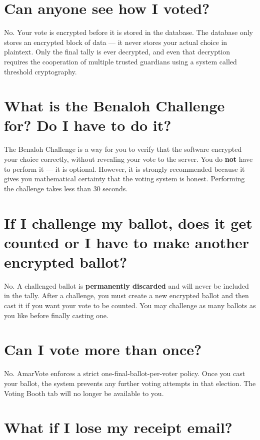 \documentclass[12pt,a4paper,openany]{book}
\begin{document}
\section*{Can anyone see how I voted?}

No. Your vote is encrypted before it is stored in the database. The database only stores an encrypted block of data --- it never stores your actual choice in plaintext.  Only the final tally is ever decrypted, and even that decryption requires the cooperation of multiple trusted guardians using a system called threshold cryptography.

\section*{What is the Benaloh Challenge for? Do I have to do it?}

The Benaloh Challenge is a way for you to verify that the software encrypted your choice correctly, without revealing your vote to the server. You do \textbf{not} have to perform it --- it is optional. However, it is strongly recommended because it gives you mathematical certainty that the voting system is honest. Performing the challenge takes less than 30 seconds.

\section*{If I challenge my ballot, does it get counted or I have to make another encrypted ballot?}

No. A challenged ballot is \textbf{permanently discarded} and will never be included in the tally. After a challenge, you must create a new encrypted ballot and then cast it if you want your vote to be counted. You may challenge as many ballots as you like before finally casting one.

\section*{Can I vote more than once?}

No. AmarVote enforces a strict one-final-ballot-per-voter policy. Once you cast your ballot, the system prevents any further voting attempts in that election. The Voting Booth tab will no longer be available to you.

\section*{What if I lose my receipt email?}
\end{document}
